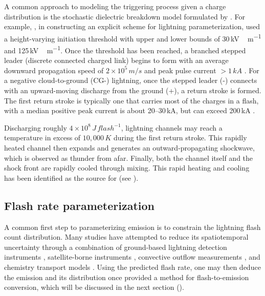 	A common approach to modeling the triggering process given a charge distribution is the stochastic dielectric breakdown model formulated by \citet{Niemeyer:1984rr,Wiesmann:1986wd}. For example, \citet{Mansell:2002kx}, in constructing an explicit scheme for lightning parameterization, used a height-varying initiation threshold with upper and lower bounds of 30\,\unit{kV\,m^{-1}} and 125\,\unit{kV\,m^{-1}}. Once the threshold has been reached, a branched stepped leader (discrete connected charged link) begins to form with an average downward propagation speed of $2\times10^5\,\unit{m/s}$ and peak pulse current $>1\,\unit{kA}$ \citep{Uman:1989aa}. For a negative cloud-to-ground (CG-) lightning, once the stepped leader (-) connects with an upward-moving discharge from the ground (+), a return stroke is formed. The first return stroke is typically one that carries most of the charges in a flash, with a median positive peak current is about 20--30\,\unit{kA},  but can exceed 200\,\unit{kA} \citep{Orville:2010uq,Cummins:2009aa}.
	
	Discharging roughly $4\times10^8\,\unit{J\,flash^{-1}}$, lightning channels may reach a temperature in excess of $10,000\,\unit{K}$ during the first return stroke. This rapidly heated channel then expands and generates an outward-propagating shockwave, which is observed as thunder from afar. Finally, both the channel itself and the shock front are rapidly cooled through mixing. This rapid heating and cooling has been identified as the source for {\lnox} (see ).
	
\subsection{Flash rate parameterization}\label{ssec:intro/lightning/flash}

	A common first step to parameterizing {\lnox} emission is to constrain the lightning flash count distribution. Many studies have attempted to reduce its spatiotemporal uncertainty through a combination of ground-based lightning detection instruments \citep[e.g.][]{Boccippio:2001ys,Hansen:2010fk}, satellite-borne instruments \citep[e.g.][]{Ushio:2001kx,Jourdain:2010tw,Martini:2011fk}, convective outflow measurements \citep[e.g.][]{Pickering:1998sh,Skamarock:2003mq}, and chemistry transport models \citep[e.g.][]{Price:1997fk,Allen:2010fk,Allen:2012fk,Ott:2010lo}. Using the predicted flash rate, one may then deduce the {\lnox} emission and its distribution once provided a method for flash-to-emission conversion, which will be discussed in the next section ().

